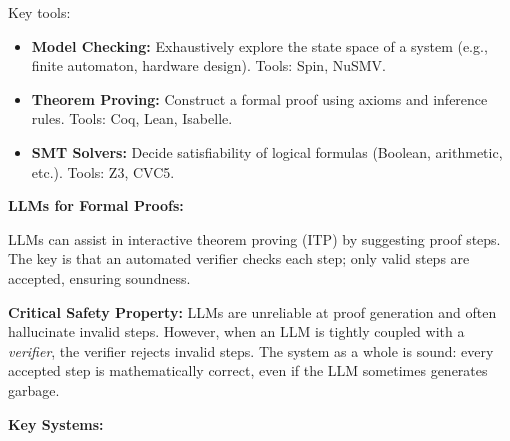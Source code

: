 Key tools:
\begin{itemize}
    \item \textbf{Model Checking:} Exhaustively explore the state space of a system (e.g., finite automaton, hardware design). Tools: Spin, NuSMV.
    \item \textbf{Theorem Proving:} Construct a formal proof using axioms and inference rules. Tools: Coq, Lean, Isabelle.
    \item \textbf{SMT Solvers:} Decide satisfiability of logical formulas (Boolean, arithmetic, etc.). Tools: Z3, CVC5.
\end{itemize}

\textbf{LLMs for Formal Proofs:}

LLMs can assist in interactive theorem proving (ITP) by suggesting proof steps. The key is that an automated verifier checks each step; only valid steps are accepted, ensuring soundness.

\begin{warnbox}
\textbf{Critical Safety Property:} LLMs are unreliable at proof generation and often hallucinate invalid steps. However, when an LLM is tightly coupled with a \emph{verifier}, the verifier rejects invalid steps. The system as a whole is sound: every accepted step is mathematically correct, even if the LLM sometimes generates garbage.
\end{warnbox}

\textbf{Key Systems:}

